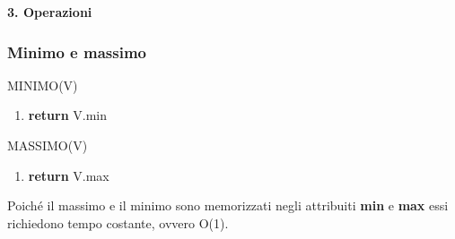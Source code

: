 \documentclass{article}
\begin{document}
\newpage
\begin{flushleft}
\huge \textbf{3. Operazioni}
\newline
\newline
\normalsize

        \subsubsection{Minimo e massimo}
            MINIMO(V)
            \begin{enumerate}
                \item \textbf{return} V.min
            \end{enumerate}

            MASSIMO(V)
            \begin{enumerate}
                \item \textbf{return} V.max
            \end{enumerate}
            
            Poiché il massimo e il minimo sono memorizzati negli attribuiti \textbf{min} e \textbf{max} essi richiedono tempo costante, ovvero O(1).
\end{flushleft}        
\end{document}
